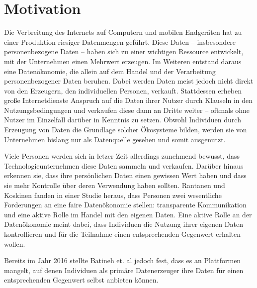 \section{Motivation}\label{Motivation}
Die Verbreitung des Internets auf Computern und mobilen Endgeräten hat zu einer Produktion riesiger Datenmengen geführt. Diese Daten -- insbesondere personenbezogene Daten -- haben sich zu einer wichtigen Ressource entwickelt, mit der Unternehmen einen Mehrwert erzeugen. Im Weiteren entstand daraus eine Datenökonomie, die allein auf dem Handel und der Verarbeitung personenbezogener Daten beruhen. \cite{humanDemand_2020} Dabei werden Daten meist jedoch nicht direkt von den Erzeugern, den individuellen Personen, verkauft. Stattdessen erheben große Internetdienste Anspruch auf die Daten ihrer Nutzer durch Klauseln in den Nutzungsbedingungen und verkaufen diese dann an Dritte weiter -- oftmals ohne Nutzer im Einzelfall darüber in Kenntnis zu setzen. Obwohl Individuen durch Erzeugung von Daten die Grundlage solcher Ökosysteme bilden, werden sie von Unternehmen bislang nur als Datenquelle gesehen und somit ausgenutzt. \cite{monetizingData_2016} \newline

\noindent Viele Personen werden sich in letzer Zeit allerdings zunehmend bewusst, dass Technologieunternehmen diese Daten sammeln und verkaufen. Darüber hinaus erkennen sie, dass ihre persönlichen Daten einen gewissen Wert haben und dass sie mehr Kontrolle über deren Verwendung haben sollten. Rantanen und Koskinen fanden in einer Studie heraus, dass Personen zwei wesentliche Forderungen an eine faire Datenökonomie stellen: transparente Kommunikation und eine aktive Rolle im Handel mit den eigenen Daten. Eine aktive Rolle an der Datenökonomie meint dabei, dass Individuen die Nutzung ihrer eigenen Daten kontrollieren und für die Teilnahme einen entsprechenden Gegenwert erhalten wollen. \cite{humanDemand_2020} \newline

\noindent Bereits im Jahr 2016 stellte Batineh et. al jedoch fest, dass es an Plattformen mangelt, auf denen Individuen als primäre Datenerzeuger ihre Daten für einen entsprechenden Gegenwert selbst anbieten können. \cite{monetizingData_2016}